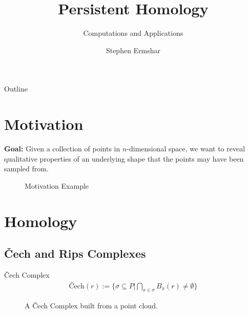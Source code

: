 

\title{Persistent Homology}
\subtitle{Computations and Applications}
\author{Stephen Ermshar}
\date{}






\begin{frame}
    \titlepage
\end{frame}

\begin{frame}{Outline}
	\tableofcontents
\end{frame}

\section[Motivation]{Motivation}
\begin{frame}
	\textbf{Goal:} Given a collection of points in \(n\)-dimensional space, we want to reveal qualitative properties of an underlying shape that the points may have been sampled from.

	\begin{figure}
		
		\caption{Motivation Example}
	\end{figure}
\end{frame}

\section[Homology]{Homology}
\subsection{\v{C}ech and Rips Complexes}
\begin{frame}
	\begin{block}{\v{C}ech Complex}
		\begin{align*}
			\textrm{\v{C}ech}(r) := \{ \sigma \subseteq P | \bigcap_{x\in \sigma} B_x(r) \neq \emptyset \}
		\end{align*}
		\cite{wagner}
	\end{block}
	\begin{figure}
		
		\caption{A \v{C}ech Complex built from a point cloud.}
	\end{figure}
\end{frame}

% 		

